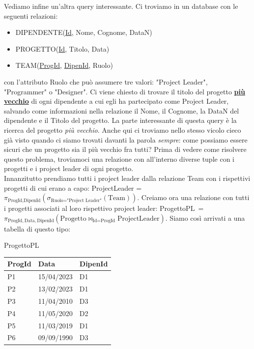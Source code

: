 \documentclass[11pt, a4paper, titlepage, oneside]{scrbook}
\begin{document}
Vediamo infine un'altra query interessante. Ci troviamo in un database con le seguenti relazioni:
\begin{itemize}
    \item DIPENDENTE(\underline{Id}, Nome, Cognome, DataN)
    \item PROGETTO(\underline{Id}, Titolo, Data)
    \item TEAM(\underline{ProgId}, \underline{DipenId}, Ruolo)
\end{itemize}
con l'attributo Ruolo che può assumere tre valori: "Project Leader", "Programmer" o "Designer". Ci viene chiesto di trovare il titolo del progetto \underline{\textbf{più vecchio}} di ogni dipendente a cui egli ha partecipato come Project Leader, salvando come informazioni nella relazione il Nome, il Cognome, la DataN del dipendente e il Titolo del progetto. La parte interessante di questa query è la ricerca del progetto \textit{più vecchio}. Anche qui ci troviamo nello stesso vicolo cieco già visto quando ci siamo trovati davanti la parola \textit{sempre}: come possiamo essere sicuri che un progetto sia il più vecchio fra tutti? Prima di vedere come risolvere questo problema, troviamoci una relazione con all'interno diverse tuple con i progetti e i project leader di ogni progetto. \\
Innanzitutto prendiamo tutti i project leader dalla relazione Team con i rispettivi progetti di cui erano a capo: ProjectLeader = $\pi_{\text{ProgId}, \text{DipenId}} (\sigma_{\text{Ruolo} = \text{"Project Leader"}}(\text{Team}))$. Creiamo ora una relazione con tutti i progetti associati al loro rispettivo project leader: \mbox{ProgettoPL = $\pi_{\text{ProgId}, \text{Data}, \text{DipenId}}(\text{Progetto} \bowtie_{\text{Id} = \text{ProgId}} \text{ProjectLeader})$}. Siamo così arrivati a una tabella di questo tipo:

\begin{center}
ProgettoPL
    
\begin{tabular}{|l|l|l|}
\hline
\textbf{ProgId} & \textbf{Data} & \textbf{DipenId}  \\ \hline
P1 & 15/04/2023 & D1 \\
P2 & 13/02/2023 & D1 \\
P3 & 11/04/2010 & D3 \\
P4 & 11/05/2020 & D2 \\
P5 & 11/03/2019 & D1 \\
P6 & 09/09/1990 & D3 \\ \hline
\end{tabular}
\end{center}
\end{document}
